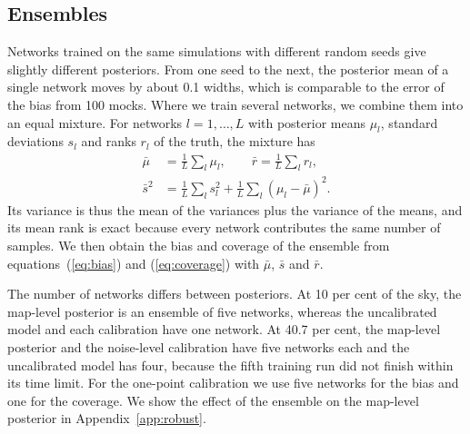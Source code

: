 \subsection{Ensembles}\label{sec:inference:ensembles}

Networks trained on the same simulations with different random seeds give slightly different posteriors.
From one seed to the next, the posterior mean of a single network moves by about 0.1 widths, which is
comparable to the error of the bias from 100 mocks. Where we train several networks, we combine them into
an equal mixture. For networks $l=1,\dots,L$ with posterior means $\mu_l$, standard deviations $s_l$ and
ranks $r_l$ of the truth, the mixture has
\begin{equation}
\begin{split}
\bar\mu &= \frac1L\sum_l\mu_l,\qquad \bar r = \frac1L\sum_l r_l,\\
\bar s^2 &= \frac1L\sum_l s_l^2 + \frac1L\sum_l\left(\mu_l-\bar\mu\right)^2.
\end{split}
\label{eq:ensemble}
\end{equation}
Its variance is thus the mean of the variances plus the variance of the means, and its mean rank is exact
because every network contributes the same number of samples. We then obtain the bias and coverage of the ensemble from equations~(\ref{eq:bias}) and (\ref{eq:coverage})
with $\bar\mu$, $\bar s$ and $\bar r$.

The number of networks differs between posteriors. At 10 per cent of the sky, the map-level posterior is an
ensemble of five networks, whereas the uncalibrated model and each calibration have one network. At 40.7
per cent, the map-level posterior and the noise-level calibration have five networks each and the
uncalibrated model has four, because the fifth training run did not finish within its time limit. For the
one-point calibration we use five networks for the bias and one for the coverage. We show the effect of the
ensemble on the map-level posterior in Appendix~\ref{app:robust}.
